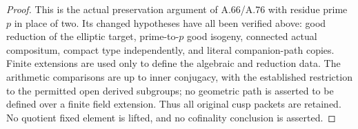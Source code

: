 \begin{proof}
This is the actual preservation argument of A.66/A.76
with residue prime \(p\) in place of two. Its changed
hypotheses have all been verified above: good reduction
of the elliptic target, prime-to-\(p\) good isogeny,
connected actual compositum, compact type independently,
and literal companion-path copies. Finite extensions
are used only to define the algebraic and reduction data.
The arithmetic comparisons are up to inner conjugacy,
with the established restriction to the permitted open
derived subgroups; no geometric path is asserted to be
defined over a finite field extension. Thus all original
cusp packets are retained. No quotient fixed element is
lifted, and no cofinality conclusion is asserted.
\end{proof}
